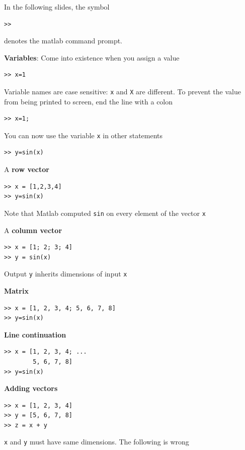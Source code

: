 \documentclass[11pt,xcolor=svgnames,onlymath]{beamer}
\begin{document}
\begin{frame}
In the following slides, the symbol
\begin{lstlisting}
>>
\end{lstlisting}
denotes the matlab command prompt.

\vspace{2mm}

{\bf Variables}: Come into existence when you assign a value
\begin{lstlisting}
>> x=1
\end{lstlisting}
Variable names are case sensitive: {\tt x} and {\tt X} are different. To prevent the value from being printed to screen, end the line with a colon
\begin{lstlisting}
>> x=1;
\end{lstlisting}
You can now use the variable {\tt x} in other statements
\begin{lstlisting}
>> y=sin(x)
\end{lstlisting}

\vspace{2mm}

A {\bf row vector}
\begin{lstlisting}
>> x = [1,2,3,4]
>> y=sin(x)
\end{lstlisting}
Note that Matlab computed {\tt sin} on every element of the vector {\tt x}

\pagebreak

A {\bf column vector}
\begin{lstlisting}
>> x = [1; 2; 3; 4]
>> y = sin(x)
\end{lstlisting}
Output {\tt y} inherits dimensions of input {\tt x}

\vspace{2mm}

{\bf Matrix}
\begin{lstlisting}
>> x = [1, 2, 3, 4; 5, 6, 7, 8]
>> y=sin(x)
\end{lstlisting}

\vspace{2mm}

{\bf Line continuation}
\begin{lstlisting}
>> x = [1, 2, 3, 4; ...
        5, 6, 7, 8]
>> y=sin(x)
\end{lstlisting}

\vspace{2mm}

{\bf Adding vectors}
\begin{lstlisting}
>> x = [1, 2, 3, 4]
>> y = [5, 6, 7, 8]
>> z = x + y
\end{lstlisting}
{\tt x} and {\tt y} must have same dimensions. The following is wrong


\end{frame}
\end{document}
